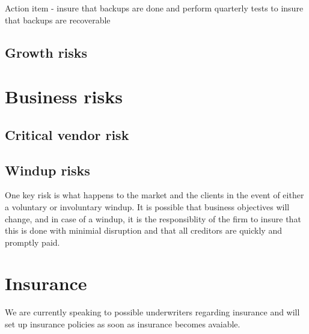 Action item - insure that backups are done and perform quarterly tests
to insure that backups are recoverable

\subsection{Growth risks}

\section{Business risks}
\subsection{Critical vendor risk}
\subsection{Windup risks}

One key risk is what happens to the market and the clients in the
event of either a voluntary or involuntary windup.  It is possible
that business objectives will change, and in case of a windup, it is
the responsiblity of the firm to insure that this is done with
minimial disruption and that all creditors are quickly and promptly
paid.

\section{Insurance}

We are currently speaking to possible underwriters regarding insurance
and will set up insurance policies as soon as insurance becomes
avaiable.

